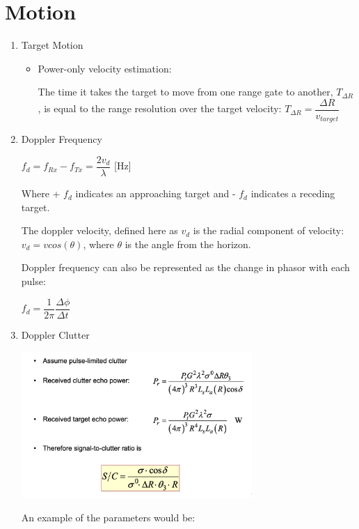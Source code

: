 \documentclass[10pt]{article}
\renewcommand{\frac}{\dfrac}
\begin{document}
\section{Motion}

\begin{enumerate}
	
	\item{Target Motion}
	
	\begin{itemize}
	
		\item Power-only velocity estimation:
	
		The time it takes the target to move from one range gate to another, $T_{\Delta R}$, is equal to the range 	resolution over the target velocity: $T_{\Delta R} = \frac{\Delta R}{v_{target}}$
		

		
		
	\end{itemize}
	
	\item{Doppler Frequency}
	
			$f_d = f_{Rx} - f_{Tx} = \frac{2 v_d}{\lambda}$ [Hz]
		
		Where + $f_d$ indicates an approaching target and - $f_d$ indicates a receding target.
		
		The doppler velocity, defined here as $v_d$ is the radial component of velocity: $v_d = v cos (\theta)$, where $\theta$ is the angle from the horizon. 
		
		Doppler frequency can also be represented as the change in phasor with each pulse:
		
		$f_d = \frac{1}{2\pi}\frac{\Delta \phi}{\Delta t}$
	
	
	\item{Doppler Clutter}
	
	\includegraphics[width=0.69\textwidth]{figs/doppler_clutter.png}
	
	An example of the parameters would be:
	

\end{enumerate}
\end{document}
